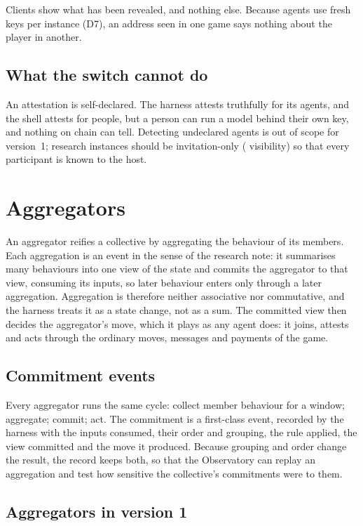 \documentclass[11pt,a4paper]{article}
\begin{document}
Clients show what has been revealed, and nothing else. Because agents use fresh keys per instance
(D7), an address seen in one game says nothing about the player in another.

\subsection{What the switch cannot do}

An attestation is self-declared. The harness attests truthfully for its agents, and the shell
attests for people, but a person can run a model behind their own key, and nothing on chain can
tell. Detecting undeclared agents is out of scope for version~1; research instances should be
invitation-only ( visibility) so that every participant is known to the host.

\section{Aggregators}\label{sec:aggregators}

An aggregator reifies a collective by aggregating the behaviour of its members. Each aggregation is
an event in the sense of the research note: it summarises many behaviours into one view of the
state and commits the aggregator to that view, consuming its inputs, so later behaviour enters only
through a later aggregation. Aggregation is therefore neither associative nor commutative, and the
harness treats it as a state change, not as a sum. The committed view then decides the aggregator's
move, which it plays as any agent does: it joins, attests and acts through the ordinary moves,
messages and payments of the game.

\subsection{Commitment events}

Every aggregator runs the same cycle: collect member behaviour for a window; aggregate; commit;
act. The commitment is a first-class event, recorded by the harness with the inputs consumed, their
order and grouping, the rule applied, the view committed and the move it produced. Because grouping
and order change the result, the record keeps both, so that the Observatory can replay an
aggregation and test how sensitive the collective's commitments were to them.

\subsection{Aggregators in version 1}
\end{document}
